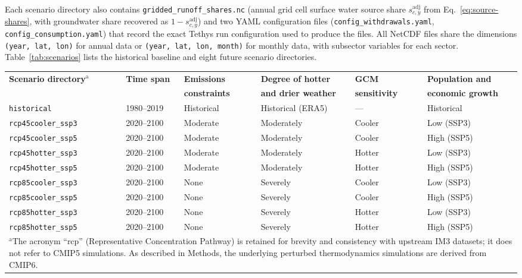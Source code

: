 \documentclass[fleqn,10pt]{wlscirep}
\begin{document}
Each scenario directory also contains \texttt{gridded\_runoff\_shares.nc} (annual grid cell surface water source share $s^{\mathrm{adj}}_{c,y}$ from Eq.~\ref{eq:source-shares}, with groundwater share recovered as $1 - s^{\mathrm{adj}}_{c,y}$) and two YAML configuration files (\texttt{config\_withdrawals.yaml}, \texttt{config\_consumption.yaml}) that record the exact Tethys run configuration used to produce the files. All NetCDF files share the dimensions \texttt{(year, lat, lon)} for annual data or \texttt{(year, lat, lon, month)} for monthly data, with subsector variables for each sector. Table~\ref{tab:scenarios} lists the historical baseline and eight future scenario directories.

\begin{table}[!ht]
\centering
\small
\begin{tabular}{llllll}
\toprule
\textbf{Scenario directory$^{\mathrm{a}}$} & \textbf{Time span} & \textbf{Emissions} & \textbf{Degree of hotter} & \textbf{GCM} & \textbf{Population and} \\
 & & \textbf{constraints} & \textbf{and drier weather} & \textbf{sensitivity} & \textbf{economic growth} \\
\midrule
\texttt{historical}         & 1980--2019 & Historical & Historical (ERA5) & ---    & Historical \\
\texttt{rcp45cooler\_ssp3}  & 2020--2100 & Moderate   & Moderately        & Cooler & Low (SSP3) \\
\texttt{rcp45cooler\_ssp5}  & 2020--2100 & Moderate   & Moderately        & Cooler & High (SSP5) \\
\texttt{rcp45hotter\_ssp3}  & 2020--2100 & Moderate   & Moderately        & Hotter & Low (SSP3) \\
\texttt{rcp45hotter\_ssp5}  & 2020--2100 & Moderate   & Moderately        & Hotter & High (SSP5) \\
\texttt{rcp85cooler\_ssp3}  & 2020--2100 & None       & Severely          & Cooler & Low (SSP3) \\
\texttt{rcp85cooler\_ssp5}  & 2020--2100 & None       & Severely          & Cooler & High (SSP5) \\
\texttt{rcp85hotter\_ssp3}  & 2020--2100 & None       & Severely          & Hotter & Low (SSP3) \\
\texttt{rcp85hotter\_ssp5}  & 2020--2100 & None       & Severely          & Hotter & High (SSP5) \\
\bottomrule
\multicolumn{6}{p{0.96\linewidth}}{\footnotesize $^{\mathrm{a}}$The acronym ``rcp'' (Representative Concentration Pathway) is retained for brevity and consistency with upstream IM3 datasets; it does not refer to CMIP5 simulations. As described in Methods, the underlying perturbed thermodynamics simulations are derived from CMIP6\cite{Jones2023TGW,Mongird2025CERF}.}

\end{tabular}
\end{table}
\end{document}

